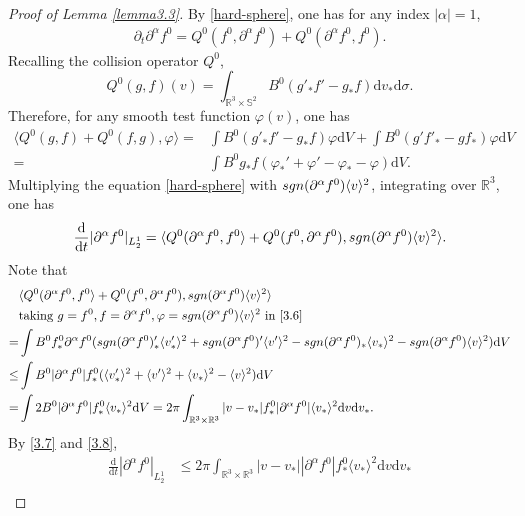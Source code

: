 \documentclass[10pt,a4paper]{amsart}
\def\pa{\partial}
\let\al=\alpha
\let\vf=\varphi
\newcommand{\beno}{\begin{eqnarray*}}
\newcommand{\beq}{\begin{equation}}
\newcommand{\eeno}{\end{eqnarray*}}
\newcommand{\eeq}{\end{equation}}
\begin{document}
\begin{proof}[Proof of Lemma \ref{lemma3.3}]
    By \eqref{hard-sphere}, one has for any index $|\al|=1$,
    \beno
\pa_{t}\pa^{\al}f^0=Q^0(f^0,\pa^{\al}f^0)+Q^0(\pa^{\al}f^0,f^0).
    \eeno
    Recalling the  collision operator $Q^0$, 
    $$Q^0(g,f)(v)=\int_{\mathbb{R}^3\times \mathbb{S}^2}B^0(g'_*f'-g_*f)\mathrm{d}v_*\mathrm{d}\sigma.$$
    Therefore, for any smooth test function $\vf(v)$, one has
    \beq\label{3.6}
\begin{aligned}
    \langle Q^0(g,f)+Q^0(f,g),\vf\rangle=&\int B^0(g'_*f'-g_*f)\vf\mathrm{d}V+\int B^0(g'f'_*-gf_*)\vf\mathrm{d}V\\
    = & \int B^0 g_*f(\vf_*'+\vf'-\vf_*-\vf)\mathrm{d}V.
\end{aligned}
    \eeq
    Multiplying the equation \eqref{hard-sphere} with $\textup{\textup{sgn}}(\pa^{\al}f^0)\langle v\rangle^2$, integrating over $\mathbb{R}^3$, one has
    \beq\label{3.7}
    \begin{aligned}
        \frac{\mathrm{d}}{\mathrm{d}t}|\pa^{\al}f^0|_{L^1_2}=\langle Q^0(\pa^{\al}f^{0},f^0\rangle+Q^0(f^0,\pa^{\al}f^{0}),\textup{\textup{sgn}}(\pa^{\al}f^0)\langle v\rangle^2\rangle.
    \end{aligned}
    \eeq
    Note that
    \beq\label{3.8}
    \begin{aligned}
    &\langle Q^0(\pa^{\al}f^{0},f^0\rangle+Q^0(f^0,\pa^{\al}f^{0}),\textup{\textup{sgn}}(\pa^{\al}f^0)\langle v\rangle^2\rangle\\
    &\text{taking $g= f^0,f=\pa^\al f^0,\vf=\textup{\textup{sgn}}(\pa^\al f^0)\langle v\rangle^2$ in \eqref{3.6}}\\
    =&\int B^0f^0_*\pa^\al f^0(\textup{\textup{sgn}}(\pa^\al f^0)'_*\langle v'_*\rangle^2+\textup{sgn}(\pa^\al f^0)'\langle v'\rangle^2-\textup{sgn}(\pa^\al f^0)_*\langle v_*\rangle^2-\textup{sgn}(\pa^\al f^0)\langle v\rangle^2)\mathrm{d}V\\
    \le& \int B^0|\pa^\al f^0|f^0_*(\langle v'_*\rangle^2+\langle v'\rangle^2+\langle v_*\rangle^2-\langle v\rangle^2)\mathrm{d}V\\
    =& \int 2B^0|\pa^{\al}f^{0}|f^0_*\langle v_*\rangle^2\mathrm{d}V=2\pi\int_{\mathbb{R}^3\times\mathbb{R}^3}|v-v_*|f^0_*|\pa^{\al}f^0|\langle v_*\rangle^2\mathrm{d}v\mathrm{d}v_*.
    \end{aligned}
    \eeq
    By \eqref{3.7} and \eqref{3.8},
    \begin{equation}\label{3.9}
    \begin{aligned}
    \frac{\mathrm{d}}{\mathrm{d}t}|\pa^{\al}f^0|_{L^1_2}&\le 2\pi \int_{\mathbb{R}^3\times\mathbb{R}^3}|v-v_*||\pa^{\al}f^{0}|f^0_*\langle v_*\rangle^2\mathrm{d}v\mathrm{d}v_*\\

\end{aligned}
\end{equation}
\end{proof}
\end{document}
